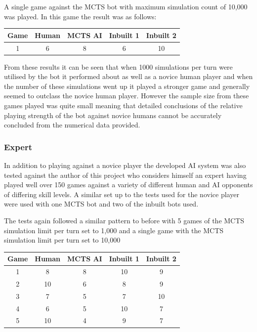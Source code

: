 \documentclass[]{article}
\begin{document}
A single game against the MCTS bot with maximum simulation count of 10,000 was played. In this game the result was as follows: 

\begin{center}
\begin{tabular}{|c||c|c|c|c|}
\hline
Game & Human & MCTS AI & Inbuilt 1 & Inbuilt 2\\
\hline
1 & 6 & 8 & 6 & 10\\
\hline
\end{tabular}
\end{center}

\par From these results it can be seen that when 1000 simulations per turn were utilised by the bot it performed about as well as a novice human player and when the number of these simulations went up it played a stronger game and generally seemed to outclass the novice human player. However the sample size from these games played was quite small meaning that detailed conclusions of the relative playing strength of the bot against novice humans cannot be accurately concluded from the numerical data provided.

\subsubsection{Expert}
In addition to playing against a novice player the developed AI system was also tested against the author of this project who considers himself an expert having played well over 150 games against a variety of different human and AI opponents of differing skill levels. A similar set up to the tests used for the novice player were used with one MCTS bot and two of the inbuilt bots used.

\par The tests again followed a similar pattern to before with 5 games of the MCTS simulation limit per turn set to 1,000 and a single game with the MCTS simulation limit per turn set to 10,000 

\begin{center}
\begin{tabular}{|c||c|c|c|c|}
\hline
Game & Human & MCTS AI & Inbuilt 1 & Inbuilt 2\\
\hline
1 & 8 & 8 & 10 & 9 \\
\hline
2 & 10 & 6 & 8 & 9 \\
\hline
3 & 7 & 5 & 7 & 10\\
\hline
4 & 6 & 5 & 10 & 7 \\
\hline
5 & 10 & 4 & 9 & 7 \\
\hline
\end{tabular}
\end{center}
\end{document}
